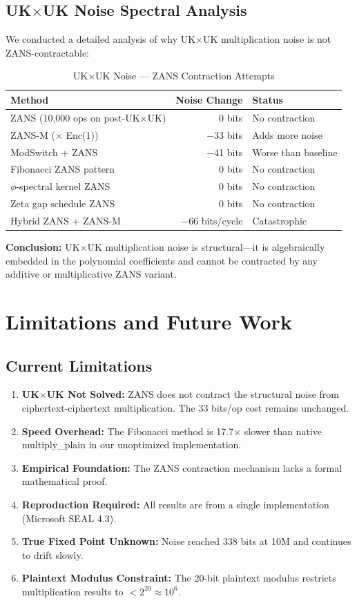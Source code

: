 \documentclass[11pt]{article}
\begin{document}
\subsection{UK$\times$UK Noise Spectral Analysis}

We conducted a detailed analysis of why UK$\times$UK multiplication noise is not ZANS-contractable:

\begin{table}[h]
\centering
\caption{UK$\times$UK Noise — ZANS Contraction Attempts}
\begin{tabular}{l|r|l}
\textbf{Method} & \textbf{Noise Change} & \textbf{Status} \\
\hline
ZANS (10,000 ops on post-UK$\times$UK) & 0 bits & No contraction \\
ZANS-M ($\times$ Enc(1)) & $-$33 bits & Adds more noise \\
ModSwitch + ZANS & $-$41 bits & Worse than baseline \\
Fibonacci ZANS pattern & 0 bits & No contraction \\
$\phi$-spectral kernel ZANS & 0 bits & No contraction \\
Zeta gap schedule ZANS & 0 bits & No contraction \\
Hybrid ZANS + ZANS-M & $-$66 bits/cycle & Catastrophic
\end{tabular}
\end{table}

\textbf{Conclusion:} UK$\times$UK multiplication noise is structural—it is algebraically embedded in the polynomial coefficients and cannot be contracted by any additive or multiplicative ZANS variant.

\section{Limitations and Future Work}

\subsection{Current Limitations}

\begin{enumerate}
    \item \textbf{UK$\times$UK Not Solved:} ZANS does not contract the structural noise from ciphertext-ciphertext multiplication. The 33 bits/op cost remains unchanged.
    \item \textbf{Speed Overhead:} The Fibonacci method is 17.7$\times$ slower than native multiply\_plain in our unoptimized implementation.
    \item \textbf{Empirical Foundation:} The ZANS contraction mechanism lacks a formal mathematical proof.
    \item \textbf{Reproduction Required:} All results are from a single implementation (Microsoft SEAL 4.3).
    \item \textbf{True Fixed Point Unknown:} Noise reached 338 bits at 10M and continues to drift slowly.
    \item \textbf{Plaintext Modulus Constraint:} The 20-bit plaintext modulus restricts multiplication results to $< 2^{20} \approx 10^6$.
\end{enumerate}
\end{document}
